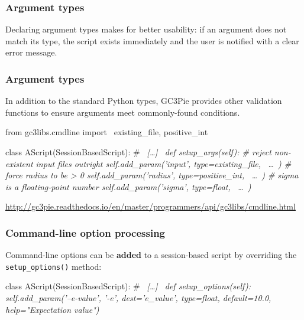 \documentclass[english,serif,mathserif,xcolor=pdftex,dvipsnames,table]{beamer}
\begin{document}
\begin{frame}[fragile]
  \frametitle{Argument types}

  Declaring argument types makes for better usability: if an argument
  does not match its type, the script exists immediately and the user
  is notified with a clear error message.

  \+
\end{frame}


\begin{frame}[fragile]
  \frametitle{Argument types}\small

  In addition to the standard Python types, GC3Pie provides other
  validation functions to ensure arguments meet commonly-found
  conditions.

\begin{python}
from gc3libs.cmdline import \
  existing_file, positive_int

class AScript(SessionBasedScript):
  # ~\em [\ldots]~
  def setup_args(self):
    # reject non-existent input files outright
    self.add_param('input',  type=existing_file, ~\ldots~)
    # force radius to be > 0
    self.add_param('radius', type=positive_int, ~\ldots~)
    #  sigma is a floating-point number
    self.add_param('sigma',  type=float, ~\ldots~)
\end{python}

\begin{references}
  \tiny\url{http://gc3pie.readthedocs.io/en/master/programmers/api/gc3libs/cmdline.html}
\end{references}
\end{frame}


\begin{frame}[fragile]
  \frametitle{Command-line option processing}

  Command-line options can be \textbf{added} to a session-based script
  by overriding the \lstinline|setup_options()| method:
  \begin{python}
class AScript(SessionBasedScript):
  # ~\em [\ldots]~
  def setup_options(self):
    self.add_param('--e-value', '-e', dest='e_value',
                   type=float, default=10.0,
                   help="Expectation value")
  \end{python}
\end{frame}
\end{document}
